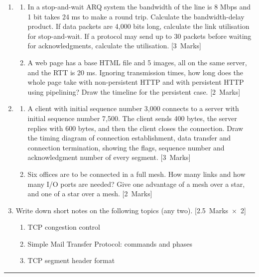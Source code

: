 \begin{enumerate}[label=\textbf{\arabic*.},leftmargin=7mm,itemsep=6pt]
\item \begin{enumerate}[label=(\alph*),leftmargin=6mm,itemsep=2pt]
\item In a stop-and-wait ARQ system the bandwidth of the line is 8 Mbps and 1 bit takes 24 ms to make a round trip. Calculate the bandwidth-delay product. If data packets are 4,000 bits long, calculate the link utilisation for stop-and-wait. If a protocol may send up to 30 packets before waiting for acknowledgments, calculate the utilisation. \hfill\mbox{[3 Marks]}
\item A web page has a base HTML file and 5 images, all on the same server, and the RTT is 20 ms. Ignoring transmission times, how long does the whole page take with non-persistent HTTP and with persistent HTTP using pipelining? Draw the timeline for the persistent case. \hfill\mbox{[2 Marks]}
\end{enumerate}

\item \begin{enumerate}[label=(\alph*),leftmargin=6mm,itemsep=2pt]
\item A client with initial sequence number 3,000 connects to a server with initial sequence number 7,500. The client sends 400 bytes, the server replies with 600 bytes, and then the client closes the connection. Draw the timing diagram of connection establishment, data transfer and connection termination, showing the flags, sequence number and acknowledgment number of every segment. \hfill\mbox{[3 Marks]}
\item Six offices are to be connected in a full mesh. How many links and how many I/O ports are needed? Give one advantage of a mesh over a star, and one of a star over a mesh. \hfill\mbox{[2 Marks]}
\end{enumerate}

\item Write down short notes on the following topics (any two). \hfill\mbox{[2.5 Marks $\times$ 2]}
\begin{enumerate}[label=(\roman*),leftmargin=8mm,itemsep=2pt]
\item TCP congestion control
\item Simple Mail Transfer Protocol: commands and phases
\item TCP segment header format
\end{enumerate}
\end{enumerate}
\begin{center}\rule{0.4\linewidth}{0.4pt}\end{center}

